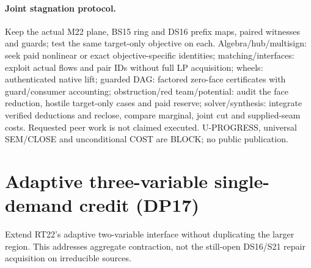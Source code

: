 \documentclass[11pt]{article}
\begin{document}
\paragraph{Joint stagnation protocol.}
Keep the actual M22 plane, BS15 ring and DS16 prefix maps, paired witnesses and guards; test the same target-only objective on each. Algebra/hub/multisign: seek paid nonlinear or exact objective-specific identities; matching/interfaces: exploit actual flows and pair IDs without full LP acquisition; wheels: authenticated native lift; guarded DAG: factored zero-face certificates with guard/consumer accounting; obstruction/red team/potential: audit the face reduction, hostile target-only cases and paid reserve; solver/synthesis: integrate verified deductions and reclose, compare marginal, joint cut and supplied-seam costs. Requested peer work is not claimed executed. U-PROGRESS, universal SEM/CLOSE and unconditional COST are BLOCK; no public publication.


\section{Adaptive three-variable single-demand credit (DP17)}\label{sec:dp17}
Extend RT22's adaptive two-variable interface without duplicating the larger region. This addresses aggregate contraction, not the still-open DS16/S21 repair acquisition on irreducible sources.
\end{document}
